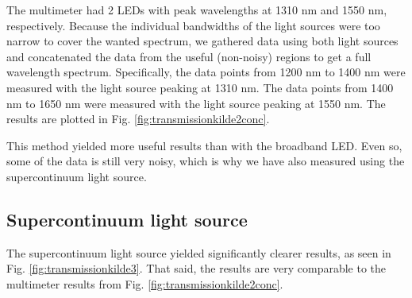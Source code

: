 The multimeter had 2 LEDs with peak wavelengths at 1310 nm and 1550 nm, respectively. Because the individual bandwidths of the light sources were too narrow to cover the wanted spectrum, we gathered data using both light sources and concatenated the data from the useful (non-noisy) regions to get a full wavelength spectrum. Specifically, the data points from 1200 nm to 1400 nm were measured with the light source peaking at 1310 nm. The data points from 1400 nm to 1650 nm were measured with the light source peaking at 1550 nm. The results are plotted in Fig. \ref{fig:transmissionkilde2conc}.

This method yielded more useful results than with the broadband LED. Even so, some of the data is still very noisy, which is why we have also measured using the supercontinuum light source.

\subsection{Supercontinuum light source}
The supercontinuum light source yielded significantly clearer results, as seen in Fig. \ref{fig:transmissionkilde3}. That said, the results are very comparable to the multimeter results from Fig. \ref{fig:transmissionkilde2conc}. 


